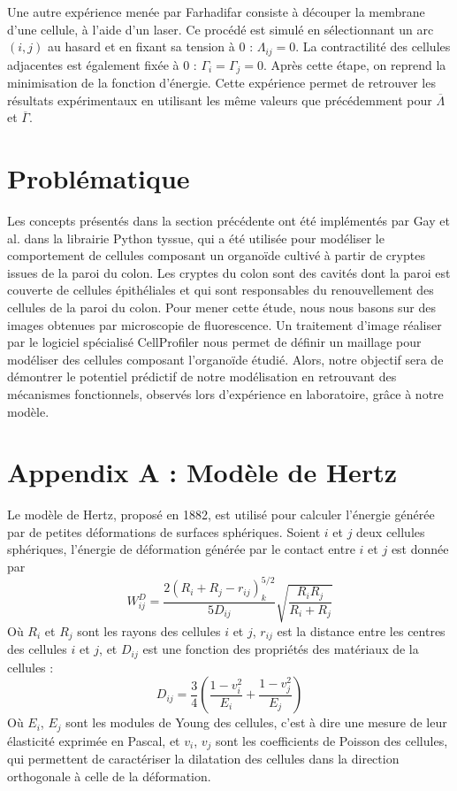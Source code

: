 \documentclass[11pt,a4paper]{article}
\begin{document}
Une autre expérience menée par Farhadifar consiste à découper la membrane d'une cellule, à l'aide d'un laser. Ce procédé est simulé en sélectionnant un arc $(i,j)$ au hasard et en fixant sa tension à 0 : $\Lambda_{ij} = 0$. La contractilité des cellules adjacentes est également fixée à 0 : $\Gamma_i=\Gamma_j=0$. Après cette étape, on reprend la minimisation de la fonction d'énergie. Cette expérience permet de retrouver les résultats expérimentaux en utilisant les même valeurs que précédemment pour $\overline{\Lambda}$ et $\overline{\Gamma}$.

\section{Problématique}

Les concepts présentés dans la section précédente ont été implémentés par Gay et al. \cite{gaygithub} dans la librairie Python tyssue, qui a été utilisée pour modéliser le comportement de cellules composant un organoïde cultivé à partir de cryptes issues de la paroi du colon. Les cryptes du colon sont des cavités dont la paroi est couverte de cellules épithéliales et qui sont responsables du renouvellement des cellules de la paroi du colon. Pour mener cette étude, nous nous basons sur des images obtenues par microscopie de fluorescence. Un traitement d'image réaliser par le logiciel spécialisé CellProfiler nous permet de définir un maillage pour modéliser des cellules composant l'organoïde étudié. 
Alors, notre objectif sera de démontrer le potentiel prédictif de notre modélisation en retrouvant des mécanismes fonctionnels, observés lors d'expérience en laboratoire, grâce à notre modèle. 

\section*{Appendix A : Modèle de Hertz}

Le modèle de Hertz, proposé en 1882, est utilisé pour calculer l'énergie générée par de petites déformations de surfaces sphériques. Soient $i$ et $j$ deux cellules sphériques, l'énergie de déformation générée par le contact entre $i$ et $j$ est donnée par $$W_{ij}^D = \frac{2(R_i+R_j-r_{ij})^{5/2}_k}{5D_{ij}}\sqrt{\frac{R_iR_j}{R_i+R_j}} $$
Où $R_i$ et $R_j$ sont les rayons des cellules $i$ et $j$, $r_{ij}$ est la distance entre les centres des cellules $i$ et $j$, et $D_{ij}$ est une fonction des propriétés des matériaux de la cellules : $$D_{ij} = \frac{3}{4}\left(\frac{1-v_i^2}{E_i}+\frac{1-v_j^2}{E_j}\right) $$
Où $E_i$, $E_j$ sont les modules de Young des cellules, c'est à dire une mesure de leur élasticité exprimée en Pascal, et $v_i$, $v_j$ sont les coefficients de Poisson des cellules, qui permettent de caractériser la dilatation des cellules dans la direction orthogonale à celle de la déformation.

{}

\end{document}
